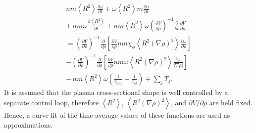 \documentclass[12pt]{iopart}
\begin{document}
\begin{eqnarray}
   n m \left<R^2\right> \frac{\partial \omega}{\partial t}
  + \omega \left<R^2\right>  m \frac{\partial n}{\partial t} \nonumber \\
  +\, n m \omega \frac{\partial \left<R^2\right>}{\partial t}
  +  n m \left<R^2\right> \omega \left( \frac{\partial V}{\partial\rho}\right)^{-1} \frac{\partial}{\partial t} \frac{\partial V}{\partial \rho} \nonumber \\
  = \left( \frac{\partial V}{\partial\rho}\right)^{-1}\frac{\partial}{\partial \rho} \left[\frac{\partial V}{\partial \rho} n m \chi_\phi \left< R^2 (\nabla \rho)^2\right> \frac{\partial\omega}{\partial\rho}\right] \nonumber \\
  - \left( \frac{\partial V}{\partial\rho}\right)^{-1}\frac{\partial}{\partial \rho} \left[\frac{\partial V}{\partial \rho}n m \omega \left< R^2 (\nabla \rho)^2\right> \frac{v_\rho}{|\nabla\rho|}\right] \nonumber \\
  -\, n m \left< R^2\right> \omega \left( \frac{1}{\tau_{\phi cx}} + \frac{1}{\tau_{c\delta}}\right) + \sum_j T_j.
\label{eq:full2}
\end{eqnarray}
It is assumed that the plasma cross-sectional shape is well controlled by a separate control loop, therefore $\left< R^2 \right>$, $\left< R^2 (\nabla\rho)^2 \right>$, and $\partial V/\partial \rho$ are held fixed.  Hence, a curve-fit of the time-average values of these functions are used as approximations.  
\end{document}
